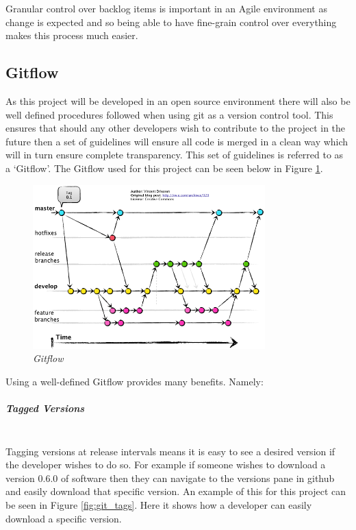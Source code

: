 Granular control over backlog items is important in an Agile environment as change is expected and so being able to have fine-grain control over everything makes this process much easier.
\subsection{Gitflow}
\label{sub:gitflow}
As this project will be developed in an open source environment there will also be well defined procedures followed when using \gls{git} as a version control tool. This ensures that should any other developers wish to contribute to the project in the future then a set of guidelines will ensure all code is merged in a clean way which will in turn ensure complete transparency. This set of guidelines is referred to as a `Gitflow'. The Gitflow used for this project can be seen below in Figure \ref{fig:gitflow}.

\begin{figure}[!ht]
\centering
\includegraphics*[width=0.8\textwidth]{images/gitflow}
\caption{\em Gitflow \citep{Driessen2010}}
\label{fig:gitflow}
\end{figure}

Using a well-defined Gitflow provides many benefits. Namely:

\subparagraph{Tagged Versions}\mbox{}\\
Tagging versions at release intervals means it is easy to see a desired version if the developer wishes to do so. For example if someone wishes to download a version 0.6.0 of software then they can navigate to the versions pane in \gls{github} and easily download that specific version. An example of this for this project can be seen in Figure \ref{fig:git_tags}. Here it shows how a developer can easily download a specific version.

